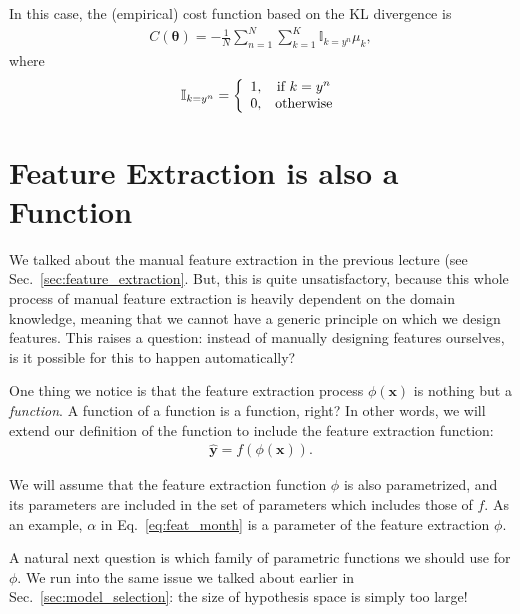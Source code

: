 \documentclass{report}
\newcommand{\vect}[1]{\mathbf{#1}}
\newcommand{\vects}[1]{\boldsymbol{#1}}
\newcommand{\vx}[0]{\vect{x}}
\newcommand{\vy}[0]{\vect{y}}
\newcommand{\TT}[0]{\vects{\theta}}
\newcommand{\II}[0]{\mathbb{I}}
\begin{document}
In this case, the (empirical) cost function based on the KL divergence is
\begin{align}
    \label{eq:cat_crossentropy}
    C(\TT) = -\frac{1}{N} \sum_{n=1}^N \sum_{k=1}^K \II_{k=y^n} \mu_k,
\end{align}
where 
\begin{align}
    \label{eq:indicator_function}
    \II_{k=y^n} = \left\{ 
        \begin{array}{c c}
            1, & \text{if }k=y^n \\
            0, & \text{otherwise}
        \end{array}
        \right.
\end{align}

\section{Feature Extraction is also a Function}
\label{sec:feature_ext}

We talked about the manual feature extraction in the previous lecture (see
Sec.~\ref{sec:feature_extraction}. But, this is quite unsatisfactory, because
this whole process of manual feature extraction is heavily dependent on the
domain knowledge, meaning that we cannot have a generic principle on which we
design features. This raises a question: instead of manually designing features
ourselves, is it possible for this to happen automatically?

One thing we notice is that the feature extraction process $\phi(\vx)$ is
nothing but a {\em function}. A function of a function is a function, right? In
other words, we will extend our definition of the function to include the
feature extraction function:
\begin{align*}
    \hat{\vy} = f(\phi(\vx)).
\end{align*}

We will assume that the feature extraction function $\phi$ is also parametrized,
and its parameters are included in the set of parameters which includes those of
$f$. As an example, $\alpha$ in Eq.~\eqref{eq:feat_month} is a parameter of the
feature extraction $\phi$.

A natural next question is which family of parametric functions we should use
for $\phi$. We run into the same issue we talked about earlier in
Sec.~\ref{sec:model_selection}: the size of hypothesis space is simply too
large!
\end{document}
